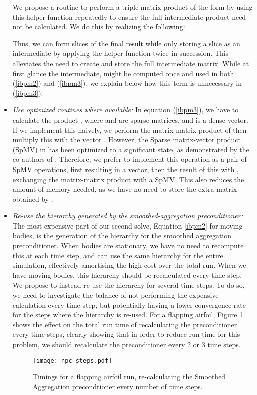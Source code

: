 \begin{itemize}
We propose a routine to perform a triple matrix product of the form  by using this helper function repeatedly to ensure the full intermediate product need not be calculated. We do this by realizing the following:


Thus, we can form slices of the final result while only storing a slice as an intermediate by applying the helper function twice in succession. This alleviates the need to create and store the full intermediate matrix. While at first glance the intermediate,  might be computed once and used in both (\ref{ibpm2}) and (\ref{ibpm3}), we explain below how this term is unnecessary in (\ref{ibpm3}).

\item \emph{Use optimized routines where available: } In equation (\ref{ibpm3}), we have to calculate the product , where  and  are sparse matrices, and  is a dense vector. If we implement this naively, we perform the matrix-matrix product of  then multiply this with the vector . However, the Sparse matrix-vector product (SpMV) in {\cusp} has been optimized to a significant state, as demonstrated by the co-authors of {\cusp}\cite{BellGarland2009}. Therefore, we prefer to implement this operation as a pair of SpMV operations, first  resulting in a vector, then the result of this with , exchanging the matrix-matrix product with a SpMV. This also reduces the amount of memory needed, as we have no need to store the extra matrix obtained by .

\item \emph{Re-use the hierarchy generated by the smoothed-aggregation preconditioner: } The most expensive part of our second solve, Equation \eqref{ibpm2} for moving bodies, is the generation of the hierarchy for the smoothed aggregation preconditioner. When bodies are stationary, we have no need to recompute this at each time step, and can use the same hierarchy for the entire simulation, effectively amortising the high cost over the total run. When we have moving bodies, this hierarchy should be recalculated every time step. We propose to instead re-use the hierarchy for several time steps. To do so, we need to investigate the balance of not performing the expensive calculation every time step, but potentially having a lower convergence rate for the steps where the hierarchy is re-used. For a flapping airfoil, Figure \ref{fig:npc_steps} shows the effect on the total run time of recalculating the preconditioner every  time steps, clearly showing that in order to reduce run time for this problem, we should recalculate the preconditioner every 2 or 3 time steps.

\begin{figure}[h]
\centering
	\texttt{[image: npc\_steps.pdf]}
	\caption{\small Timings for a flapping airfoil run, re-calculating the Smoothed Aggregation precondtioner every number of time steps.}
	\label{fig:npc_steps}
\end{figure}

\end{itemize}

